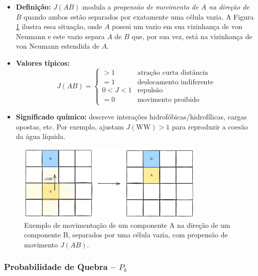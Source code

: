 \documentclass[12pt,oneside]{report}
\begin{document}
\begin{itemize}
    \item \textbf{Definição:} $J(AB)$ modula a
          \emph{propensão de movimento de $A$ na direção de $B$}
          quando ambos estão separados por exatamente uma célula vazia. A Figura \ref{fig:movimentacao_juncao} ilustra essa situação, onde $A$ possui um vazio em sua vizinhança de von Neumann e este vazio separa $A$ de $B$ que, por sua vez, está na vizinhança de von Neumann estendida de $A$.
    \item \textbf{Valores típicos:}
          \[
              J(AB)=
              \begin{cases}
                  >1    & \text{atração curta distância}  \\[2pt]
                  =1    & \text{deslocamento indiferente} \\[2pt]
                  0<J<1 & \text{repulsão}                 \\[2pt]
                  =0    & \text{movimento proibido}
              \end{cases}
          \]
    \item \textbf{Significado químico:} descreve interações
          hidrofóbicas/hidrofílicas, cargas opostas, etc.
          Por exemplo, \citeauthor{kier2005} ajustam
          $J(\mathrm{WW})>1$ para reproduzir a coesão da água líquida.
\end{itemize}

\begin{figure}[H]
    \centering
    \includegraphics[width=0.8\textwidth]{Jab.png}
    \caption{\small Exemplo de movimentação de um componente A na direção de um componente B, separados por uma célula vazia, com propensão de movimento $J(AB)$.}
    \label{fig:movimentacao_juncao}
\end{figure}

\subsubsection{Probabilidade de Quebra – \texorpdfstring{$P_b$}{Pb}}
\label{subsubsec:Pb}
\end{document}
